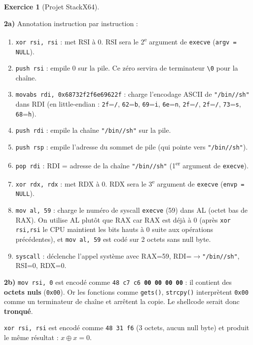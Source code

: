\documentclass[a4paper,11pt]{article}
\theoremstyle{plain}
\theoremstyle{definition}
\newtheorem{exercice}{Exercice}
\begin{document}
\begin{exercice}[Projet StackX64]
\begin{correction}

\textbf{2a)} Annotation instruction par instruction :
\begin{enumerate}
    \item \texttt{xor rsi, rsi} : met RSI à 0. RSI sera le 2\textsuperscript{e} argument de \texttt{execve} (\texttt{argv = NULL}).
    \item \texttt{push rsi} : empile 0 sur la pile. Ce zéro servira de terminateur \texttt{\textbackslash 0} pour la chaîne.
    \item \texttt{movabs rdi, 0x68732f2f6e69622f} : charge l'encodage ASCII de \texttt{"/bin//sh"} dans RDI (en little-endian : \texttt{2f}=\texttt{/}, \texttt{62}=\texttt{b}, \texttt{69}=\texttt{i}, \texttt{6e}=\texttt{n}, \texttt{2f}=\texttt{/}, \texttt{2f}=\texttt{/}, \texttt{73}=\texttt{s}, \texttt{68}=\texttt{h}).
    \item \texttt{push rdi} : empile la chaîne \texttt{"/bin//sh"} sur la pile.
    \item \texttt{push rsp} : empile l'adresse du sommet de pile (qui pointe vers \texttt{"/bin//sh"}).
    \item \texttt{pop rdi} : RDI = adresse de la chaîne \texttt{"/bin//sh"} (1\textsuperscript{er} argument de \texttt{execve}).
    \item \texttt{xor rdx, rdx} : met RDX à 0. RDX sera le 3\textsuperscript{e} argument de \texttt{execve} (\texttt{envp = NULL}).
    \item \texttt{mov al, 59} : charge le numéro de syscall \texttt{execve} (59) dans AL (octet bas de RAX). On utilise AL plutôt que RAX car RAX est déjà à 0 (après \texttt{xor rsi,rsi} le CPU maintient les bits hauts à 0 suite aux opérations précédentes), et \texttt{mov al, 59} est codé sur 2 octets sans null byte.
    \item \texttt{syscall} : déclenche l'appel système avec RAX=59, RDI=$\to$\texttt{"/bin//sh"}, RSI=0, RDX=0.
\end{enumerate}

\textbf{2b)} \texttt{mov rsi, 0} est encodé comme \texttt{48 c7 c6 \textbf{00 00 00 00}} : il contient des \textbf{octets nuls} (\texttt{0x00}). Or les fonctions comme \texttt{gets()}, \texttt{strcpy()} interprètent \texttt{0x00} comme un terminateur de chaîne et arrêtent la copie. Le shellcode serait donc \textbf{tronqué}.

\texttt{xor rsi, rsi} est encodé comme \texttt{48 31 f6} (3 octets, aucun null byte) et produit le même résultat : $x \oplus x = 0$.


\end{correction}
\end{exercice}
\end{document}
